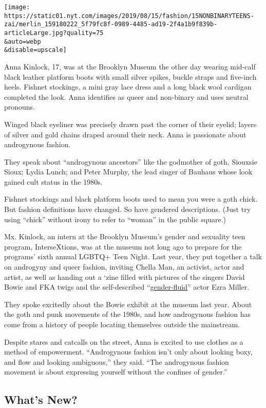 \texttt{[image: https://static01.nyt.com/images/2019/08/15/fashion/15NONBINARYTEENS-zai/merlin\_159180222\_5f79fc8f-0989-4485-ad19-2f4a1b9f839b-articleLarge.jpg?quality=75\\\&auto=webp\\\&disable=upscale]}

Anna Kinlock, 17, was at the Brooklyn Museum the other day wearing
mid-calf black leather platform boots with small silver spikes, buckle
straps and five-inch heels. Fishnet stockings, a mini gray lace dress
and a long black wool cardigan completed the look. Anna identifies as
queer and non-binary and uses neutral pronouns.

Winged black eyeliner was precisely drawn past the corner of their
eyelid; layers of silver and gold chains draped around their neck. Anna
is passionate about androgynous fashion.

They speak about ``androgynous ancestors'' like the godmother of goth,
Siouxsie Sioux; Lydia Lunch; and Peter Murphy, the lead singer of
Bauhaus whose look gained cult status in the 1980s.

Fishnet stockings and black platform boots used to mean you were a goth
chick. But fashion definitions have changed. So have gendered
descriptions. (Just try using ``chick'' without irony to refer to
``woman'' in the public square.)

Mx. Kinlock, an intern at the Brooklyn Museum's gender and sexuality
teen program, InterseXtions, was at the museum not long ago to prepare
for the programs' sixth annual LGBTQ+ Teen Night. Last year, they put
together a talk on androgyny and queer fashion, inviting Chella Man, an
activist, actor and artist, as well as handing out a `zine filled with
pictures of the singers David Bowie and FKA twigs and the self-described
``\href{https://www.gq.com/story/ezra-miller-gq-style-cover-story}{gender-fluid}''
actor Ezra Miller.

They spoke excitedly about the Bowie exhibit at the museum last year.
About the goth and punk movements of the 1980s, and how androgynous
fashion has come from a history of people locating themselves outside
the mainstream.

Despite stares and catcalls on the street, Anna is excited to use
clothes as a method of empowerment. ``Androgynous fashion isn't only
about looking boxy, and flow and looking ambiguous,'' they said. ``The
androgynous fashion movement is about expressing yourself without the
confines of gender.''

\hypertarget{whats-new}{%
\subsection{What's New?}\label{whats-new}}

